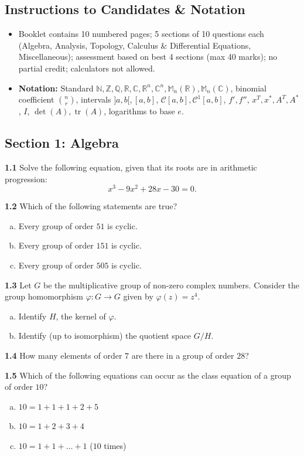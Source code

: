 \documentclass[11pt,a4paper]{article}
\newcommand{\N}{\mathbb{N}}
\newcommand{\Z}{\mathbb{Z}}
\newcommand{\Q}{\mathbb{Q}}
\newcommand{\R}{\mathbb{R}}
\newcommand{\C}{\mathbb{C}}
\newcommand{\M}{\mathbb{M}}
\newcommand{\tr}{\operatorname{tr}}
\newcommand{\examsec}[1]{%
  \subsection*{#1}
  \vspace{-2pt}
}
\newcommand{\qitem}[1]{\par\medskip\noindent\textbf{#1}\hspace{0.5em}}
\begin{document}
\subsection*{Instructions to Candidates \& Notation}
\begin{itemize}
  \item Booklet contains 10 numbered pages; 5 sections of 10 questions each (Algebra, Analysis, Topology, Calculus \& Differential Equations, Miscellaneous); assessment based on best 4 sections (max 40 marks); no partial credit; calculators not allowed.
  \item \textbf{Notation:} Standard $\N, \Z, \Q, \R, \C, \R^n, \C^n, \M_n(\R), \M_n(\C)$, binomial coefficient $\binom{n}{r}$, intervals $]a, b[, [a, b]$, $\mathcal{C}[a, b], \mathcal{C}^1[a, b]$, $f', f''$, $x^T, x^*, A^T, A^*$, $I$, $\det(A), \tr(A)$, logarithms to base $e$.
\end{itemize}

\examsec{Section 1: Algebra}

\qitem{1.1} Solve the following equation, given that its roots are in arithmetic progression:
\[
  x^3 - 9x^2 + 28x - 30 = 0.
\]

\qitem{1.2} Which of the following statements are true?
\begin{enumerate}[a.]
  \item Every group of order $51$ is cyclic.
  \item Every group of order $151$ is cyclic.
  \item Every group of order $505$ is cyclic.
\end{enumerate}

\qitem{1.3} Let $G$ be the multiplicative group of non-zero complex numbers. Consider the group homomorphism $\varphi : G \to G$ given by $\varphi(z) = z^4$.
\begin{enumerate}[a.]
  \item Identify $H$, the kernel of $\varphi$.
  \item Identify (up to isomorphism) the quotient space $G/H$.
\end{enumerate}

\qitem{1.4} How many elements of order $7$ are there in a group of order $28$?

\qitem{1.5} Which of the following equations can occur as the class equation of a group of order $10$?
\begin{enumerate}[a.]
  \item $10 = 1 + 1 + 1 + 2 + 5$
  \item $10 = 1 + 2 + 3 + 4$
  \item $10 = 1 + 1 + \dots + 1$ ($10$ times)
\end{enumerate}
\end{document}
